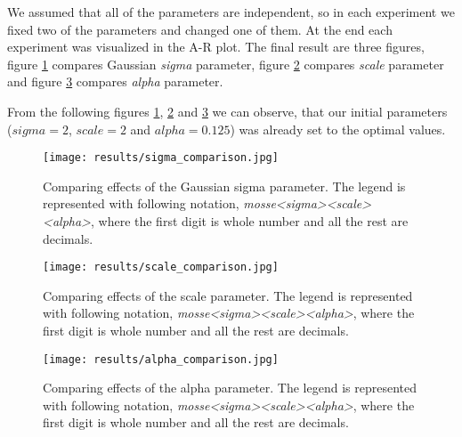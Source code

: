 \documentclass[runningheads]{llncs}
\begin{document}
We assumed that all of the parameters are independent, so in each experiment we fixed two of the parameters and changed one of them. At the end each experiment was visualized in the A-R plot. The final result are three figures, figure \ref{img_sigma_analysis} compares Gaussian \textit{sigma} parameter, figure \ref{img_scale_analysis} compares \textit{scale} parameter and figure \ref{img_alpha_analysis} compares \textit{alpha} parameter.

From the following figures \ref{img_sigma_analysis}, \ref{img_scale_analysis} and \ref{img_alpha_analysis} we can observe, that our initial parameters ($sigma = 2$, $scale = 2$ and $alpha = 0.125$) was already set to the optimal values.

\begin{figure}
    \centering
    \texttt{[image: results/sigma\_comparison.jpg]}
    \caption{Comparing effects of the Gaussian sigma parameter. \newline
    The legend is represented with following notation, \textit{mosse\textunderscore\textless sigma\textgreater\textunderscore\textless scale\textgreater\textunderscore\textless alpha\textgreater}, where the first digit is whole number and all the rest are decimals.}
    \label{img_sigma_analysis}
\end{figure}

\begin{figure}
    \centering
    \texttt{[image: results/scale\_comparison.jpg]}
    \caption{Comparing effects of the scale parameter. \newline
    The legend is represented with following notation, \textit{mosse\textunderscore\textless sigma\textgreater\textunderscore\textless scale\textgreater\textunderscore\textless alpha\textgreater}, where the first digit is whole number and all the rest are decimals.}
    \label{img_scale_analysis}
\end{figure}

\begin{figure}
    \centering
    \texttt{[image: results/alpha\_comparison.jpg]}
    \caption{Comparing effects of the alpha parameter. \newline
    The legend is represented with following notation, \textit{mosse\textunderscore\textless sigma\textgreater\textunderscore\textless scale\textgreater\textunderscore\textless alpha\textgreater}, where the first digit is whole number and all the rest are decimals.}
    \label{img_alpha_analysis}
\end{figure}
\end{document}
